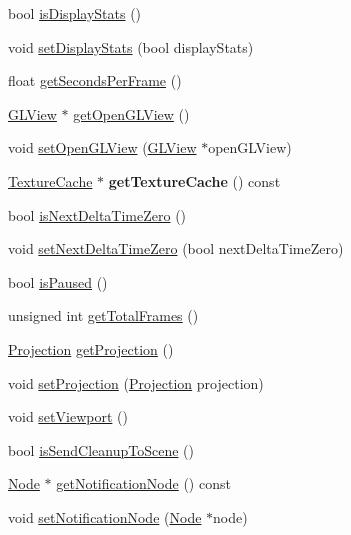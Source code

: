\begin{DoxyCompactItemize}
bool \hyperlink{classDirector_a922631f5a39265d96972d63ddb76a7fc}{is\+Display\+Stats} ()
\item 
void \hyperlink{classDirector_a97986d4c3f91e7758316e3f0a0396baa}{set\+Display\+Stats} (bool display\+Stats)
\item 
float \hyperlink{classDirector_a38da2885fd753374ee9e2cd545b9ae4c}{get\+Seconds\+Per\+Frame} ()
\item 
\hyperlink{classGLView}{G\+L\+View} $\ast$ \hyperlink{classDirector_a9480a6fa03967568e72b392e2b53c599}{get\+Open\+G\+L\+View} ()
\item 
void \hyperlink{classDirector_a6c9edb0fdb7c3c7142e90a16b80b0949}{set\+Open\+G\+L\+View} (\hyperlink{classGLView}{G\+L\+View} $\ast$open\+G\+L\+View)
\item 
\mbox{\label{classDirector_a5fc2f5faa3030ecde94ace77a995c07e}} 
\hyperlink{classTextureCache}{Texture\+Cache} $\ast$ {\bfseries get\+Texture\+Cache} () const
\item 
bool \hyperlink{classDirector_a5f2f66a2f14f63e2a5fabb601c972b8b}{is\+Next\+Delta\+Time\+Zero} ()
\item 
void \hyperlink{classDirector_a809b5dca9ab9d0896d2a9e201e2177ae}{set\+Next\+Delta\+Time\+Zero} (bool next\+Delta\+Time\+Zero)
\item 
bool \hyperlink{classDirector_a18b86013970deb49290996518f0ddae5}{is\+Paused} ()
\item 
unsigned int \hyperlink{classDirector_a2876d2ae1cc0b6832620f1144c38142a}{get\+Total\+Frames} ()
\item 
\hyperlink{classDirector_aaa3d9a0eac7c805d87ecba67c974fcf2}{Projection} \hyperlink{classDirector_a36e916d304e26fb6861b497806dc9980}{get\+Projection} ()
\item 
void \hyperlink{classDirector_a4cffcad9b7c5cbb16e5e0780ab5401b9}{set\+Projection} (\hyperlink{classDirector_aaa3d9a0eac7c805d87ecba67c974fcf2}{Projection} projection)
\item 
void \hyperlink{classDirector_aa93aca162b691b52a1ec1d206ca39a64}{set\+Viewport} ()
\item 
bool \hyperlink{classDirector_a882d9e2320d19b11b1cfab88a4439833}{is\+Send\+Cleanup\+To\+Scene} ()
\item 
\hyperlink{classNode}{Node} $\ast$ \hyperlink{classDirector_a33fe947ebf154c242198d3ad0d95cba4}{get\+Notification\+Node} () const
\item 
void \hyperlink{classDirector_ae94a4dda12c81955813683e016f769dd}{set\+Notification\+Node} (\hyperlink{classNode}{Node} $\ast$node)

\end{DoxyCompactItemize}
